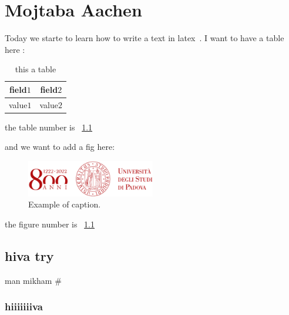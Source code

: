 \chapter{Mojtaba Aachen}
\label{mojtaba}

Today we starte to learn how to write a text in latex~\cite{online1}. 
I want to have a table here :

\begin{table}[h]
\centering
\begin{tabular}{c|c}
\toprule
field$1$ & field$2$ \\ \midrule
value$1$ & value$2$ \\
\bottomrule
\end{tabular}
\caption{this a table}
\label{tab:1 moj}
\end{table}

the table number is ~\ref{tab:1 moj}

and we want to add a fig here:
\begin{figure}[h]
\centering
\includegraphics[width=0.5\textwidth]{figures/example.png}
\caption[Example of caption.]{Example of caption.\label{fig:1 moj}}
\end{figure}

the figure number is ~\ref{fig:1 moj}
\section{hiva try}
man mikham 
#
\subsection{hiiiiiiiva}
